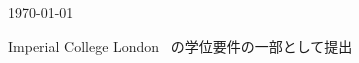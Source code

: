 \begin{titlepage}



{\large \today} %


\vfill %
Imperial College London \degreetype~の学位要件の一部として提出

\end{titlepage}
